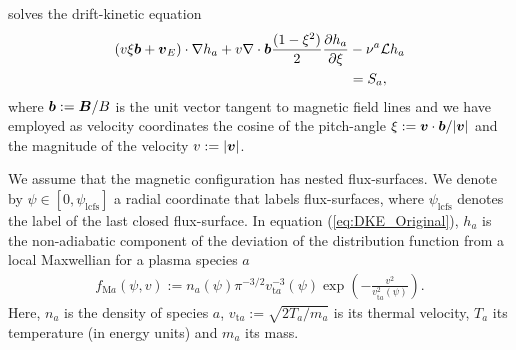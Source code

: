 {\MONKES} solves the drift-kinetic equation 
%
\begin{align}
(v \xi \vb*{b}  + \vb*{v}_E) \cdot \nabla h_a 
	+
	v\nabla \cdot \vb*{b} \frac{(1-\xi^2)}{2}  \pdv{h_a}{\xi}  
	& - \nu^{a} \mathcal{L} h_a
		\nonumber \\
	& = S_a,
	\label{eq:DKE_Original}
\end{align}
where $\vb*{b}:= \vb*{B}/B$ is the unit vector tangent to magnetic field lines and we have employed as velocity coordinates the cosine of the pitch-angle $\xi := \vb*{v}\cdot\vb*{b}/|\vb*{v}|$ and the magnitude of the velocity $v:=|\vb*{v}|$. 

We assume that the magnetic configuration has nested flux-surfaces. We denote by $\psi\in[0,\psi_{\text{lcfs}}]$ a radial coordinate that labels flux-surfaces, where $\psi_{\text{lcfs}}$ denotes the label of the last closed flux-surface. In equation (\ref{eq:DKE_Original}), $h_a$ is the non-adiabatic component of the deviation of the distribution function from a local Maxwellian for a plasma species $a$ 
%
\begin{align}
	f_{\text{M}a}(\psi, v) :=   n_a(\psi)  \pi^{-3/2}  {v_{\text{t}a}^{-3}(\psi)}  \exp(-\frac{v^2}{v_{\text{t}a}^2(\psi)}).
\end{align}
Here, $n_a$ is the density of species $a$, $v_{\text{t}a} := \sqrt{2T_a/m_a}$ is its thermal velocity, $T_a$ its temperature (in energy units) and $m_a$ its mass. 

%

